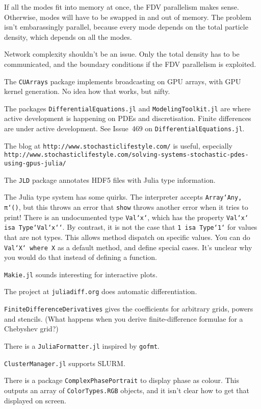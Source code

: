 If all the modes fit into memory at once, the FDV parallelism makes
sense.  Otherwise, modes will have to be swapped in and out of
memory.  The problem isn't embarassingly parallel, because every
mode depends on the total particle density, which depends on all
the modes.

Network complexity shouldn't be an issue.  Only the total density
has to be communicated, and the boundary conditions if the FDV
parallelism is exploited.


The {\tt CUArrays} package implements broadcasting on GPU arrays, with GPU kernel generation.  No idea how that works, but nifty.

The packages {\tt DifferentialEquations.jl} and {\tt ModelingToolkit.jl} are where active development is happening on PDEs and discretisation.  Finite differences are under active development.  See Issue~469 on {\tt DifferentialEquations.jl}.

The blog at {\tt http://www.stochasticlifestyle.com/} is useful, especially {\tt http://www.stochasticlifestyle.com/solving-systems-stochastic-pdes-using-gpus-julia/}

The {\tt JLD} package annotates HDF5 files with Julia type information.

The Julia type system has some quirks.  The interpreter accepts {\tt Array`{Any, π`}()}, but this throws an error that {\tt show} throws another error when it tries to print!  There is an undocumented type {\tt Val`{x`}}, which has the property {\tt Val`{x`} isa Type`{Val`{x`}`}}.  By contrast, it is not the case that {\tt 1 isa Type`{1`}} for values that are not types.  This allows method dispatch on specific values.  You can do {\tt Val`{X`} where X} as a default method, and define special cases.  It's unclear why you would do that instead of defining a function.

{\tt Makie.jl} sounds interesting for interactive plots.

The project at {\tt juliadiff.org} does automatic differentiation.

{\tt FiniteDifferenceDerivatives} gives the coefficients for arbitrary grids, powers and stencils.  (What happens when you derive finite-difference formulae for a Chebyshev grid?)

There is a {\tt JuliaFormatter.jl} inspired by {\tt gofmt}.

{\tt ClusterManager.jl} supports SLURM.

There is a package {\tt ComplexPhasePortrait} to display phase as colour.  This outputs an array of {\tt ColorTypes.RGB} objects, and it isn't clear how to get that displayed on screen.

